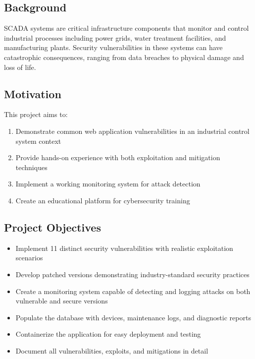 \documentclass[12pt,a4paper]{article}
\begin{document}
\subsection{Background}

SCADA systems are critical infrastructure components that monitor and control industrial processes including power grids, water treatment facilities, and manufacturing plants. Security vulnerabilities in these systems can have catastrophic consequences, ranging from data breaches to physical damage and loss of life.

\subsection{Motivation}

This project aims to:
\begin{enumerate}[leftmargin=*]
    \item Demonstrate common web application vulnerabilities in an industrial control system context
    \item Provide hands-on experience with both exploitation and mitigation techniques
    \item Implement a working monitoring system for attack detection
    \item Create an educational platform for cybersecurity training
\end{enumerate}

\subsection{Project Objectives}

\begin{itemize}[leftmargin=*]
    \item Implement 11 distinct security vulnerabilities with realistic exploitation scenarios
    \item Develop patched versions demonstrating industry-standard security practices
    \item Create a monitoring system capable of detecting and logging attacks on both vulnerable and secure versions
    \item Populate the database with devices, maintenance logs, and diagnostic reports
    \item Containerize the application for easy deployment and testing
    \item Document all vulnerabilities, exploits, and mitigations in detail
\end{itemize}
\end{document}
